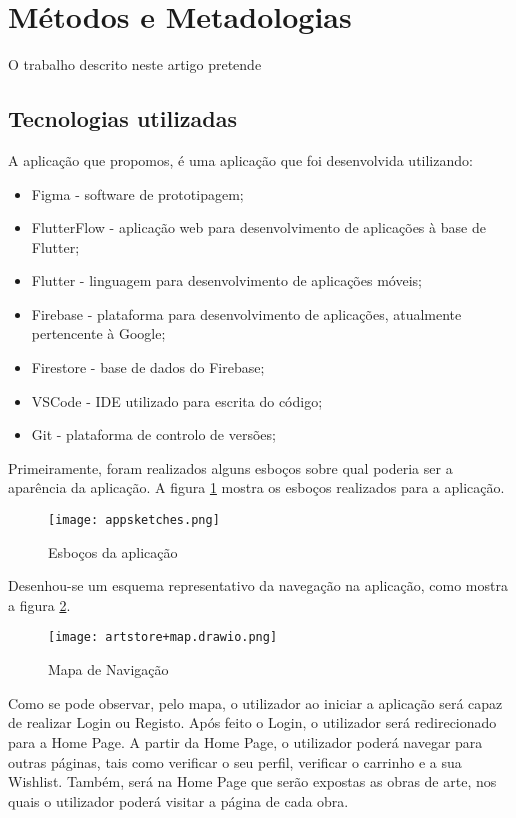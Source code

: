 \documentclass[conference]{IEEEtran}
\begin{document}
\section{Métodos e Metadologias}

O trabalho descrito neste artigo pretende 

\subsection{Tecnologias utilizadas}

A aplicação que propomos, é uma aplicação que foi desenvolvida utilizando:

\begin{itemize}
    \item Figma - software de prototipagem;
    \item FlutterFlow - aplicação web para desenvolvimento de aplicações à base de Flutter;
    \item Flutter - linguagem para desenvolvimento de aplicações móveis;
    \item Firebase - plataforma para desenvolvimento de aplicações, atualmente pertencente à Google;
    \item Firestore - base de dados do Firebase;
    \item VSCode - IDE utilizado para escrita do código;
    \item Git - plataforma de controlo de versões;
\end{itemize}

Primeiramente, foram realizados alguns esboços sobre qual poderia ser a aparência da aplicação. A figura \ref{fig:sketches} 
mostra os esboços realizados para a aplicação.

\begin{figure}[ht]
    \centering
    \texttt{[image: appsketches.png]}
    \caption{Esboços da aplicação}
    \label{fig:sketches}
\end{figure}

Desenhou-se um esquema representativo da navegação na aplicação, como mostra a figura \ref{fig:navmap}.

\begin{figure}[ht]
    \centering
    \texttt{[image: artstore+map.drawio.png]}
    \caption{Mapa de Navigação}
    \label{fig:navmap}
\end{figure}

Como se pode observar, pelo mapa, o utilizador ao iniciar a aplicação será capaz de realizar Login ou Registo. 
Após feito o Login, o utilizador será redirecionado para a Home Page. A partir da Home Page, o utilizador poderá 
navegar para outras páginas, tais como verificar o seu perfil, verificar o carrinho e a sua Wishlist. Também, 
será na Home Page que serão expostas as obras de arte, nos quais o utilizador poderá visitar a página de cada obra. 
\end{document}
